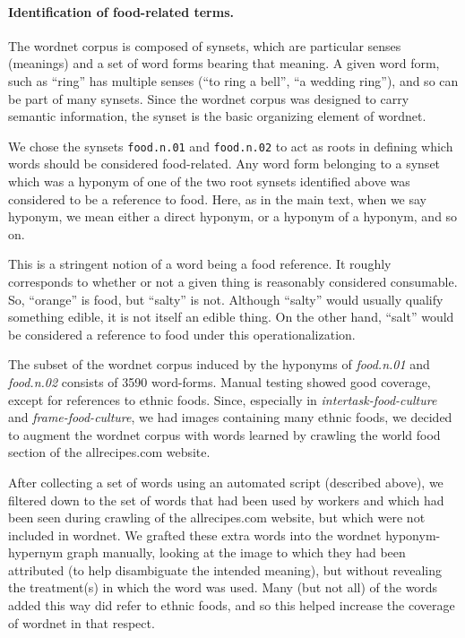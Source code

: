 \documentclass[12pt]{article}
\begin{document}
\paragraph{Identification of food-related terms.}
The wordnet corpus is composed of synsets, which are particular senses 
(meanings) and a set of word forms bearing that meaning. A given word form, 
such as ``ring'' has multiple senses (``to ring a bell'', ``a wedding ring''),
and so can be part of many synsets.  Since the wordnet corpus was designed
to carry semantic information, the synset is the basic organizing element
of wordnet.

We chose the synsets \texttt{food.n.01} and \texttt{food.n.02} to act as roots
in defining which words should be considered food-related.  Any word form
belonging to a synset which was a hyponym of one of the two root synsets
identified above was considered to be a reference to food.  Here, as in the
main text, when we say hyponym, we mean either a direct hyponym, or a hyponym
of a hyponym, and so on.

This is a stringent notion of a word being a food reference.  It roughly
corresponds to whether or not a given thing is reasonably considered 
consumable.  So, ``orange'' is food, but ``salty'' is not.  Although ``salty''
would usually qualify something edible, it is not itself an edible thing.
On the other hand, ``salt'' would be considered a reference to food under 
this operationalization.

The subset of the wordnet corpus induced by the hyponyms of \textit{food.n.01}
and \textit{food.n.02} consists of 3590 word-forms.  Manual
testing showed good coverage, except for references to ethnic foods.  
Since, especially in \textit{intertask-food-culture} and 
\textit{frame-food-culture}, we had images containing many ethnic 
foods, we decided to augment the wordnet corpus with words learned by 
crawling the world food section of the allrecipes.com website.  

After collecting a set of words using an automated script 
(described above), we filtered down to the set of words that had been used by
workers and which had been seen during crawling of the allrecipes.com website,
but which were not included in wordnet.  We grafted these extra words into
the wordnet hyponym-hypernym graph manually, looking at the image to which 
they had been attributed (to help disambiguate the intended meaning), but 
without revealing the treatment(s) in which
the word was used.  Many (but not all) of the words added this way did refer 
to ethnic foods, and so this helped increase the coverage of wordnet in that 
respect.
\end{document}
